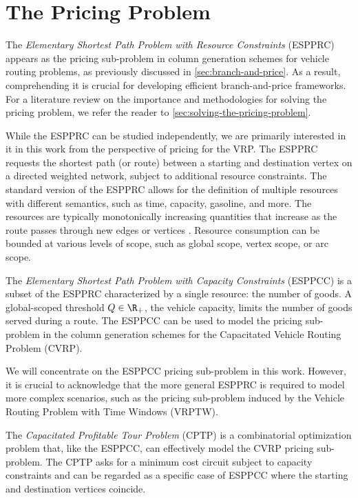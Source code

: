 \chapter{The Pricing Problem}
\label{sec:the-pricing-problem}

The \textit{Elementary Shortest Path Problem with Resource Constraints} (ESPPRC)
appears as the pricing sub-problem in column generation schemes
for vehicle routing problems, as previously discussed in \cref{sec:branch-and-price}.
As a result, comprehending it is crucial for developing efficient branch-and-price frameworks.
For a literature review on the importance and methodologies
for solving the pricing problem,
we refer the reader to  \cref{sec:solving-the-pricing-problem}.

While the ESPPRC can be studied independently,
we are primarily interested in it in this work from the perspective of pricing for the VRP.
The ESPPRC requests the shortest path (or route)
between a starting and destination vertex on a directed weighted network,
subject to additional resource constraints.
The standard version of the ESPPRC allows for the definition of multiple resources with different semantics, such as time, capacity, gasoline, and more.
The resources are typically monotonically increasing quantities
that increase as the route passes through new edges or vertices \parencite{irnich2005, irnich2007resource}.
Resource consumption can be bounded at various levels of scope,
such as global scope, vertex scope, or arc scope.

The \textit{Elementary Shortest Path Problem with Capacity Constraints} (ESPPCC)
is a subset of the ESPPRC characterized by a single resource: the number of goods.
A global-scoped threshold $Q \in \R_{+}$, the vehicle capacity,
limits the number of goods served during a route.
The ESPPCC can be used to model the pricing sub-problem in the column
generation schemes for the Capacitated Vehicle Routing Problem (CVRP).

We will concentrate on the ESPPCC pricing sub-problem in this work.
However,
it is crucial to acknowledge that the more general ESPPRC is required to model more complex scenarios,
such as the pricing sub-problem induced by the Vehicle Routing Problem with Time Windows (VRPTW).

The \textit{Capacitated Profitable Tour Problem} (CPTP)
is a combinatorial optimization problem that, like the ESPPCC,
can effectively model the CVRP pricing sub-problem.
The CPTP asks for a minimum cost circuit subject to capacity constraints
and can be regarded as a specific case of ESPPCC where the starting
and destination vertices coincide.

